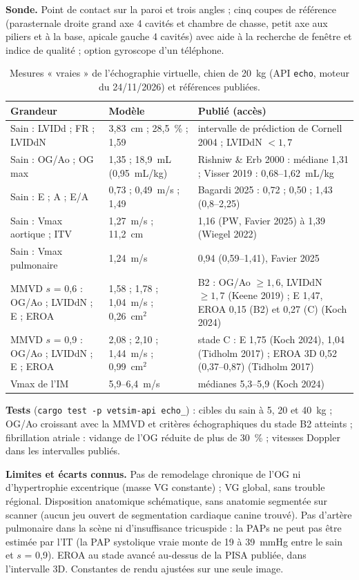 \documentclass[10pt,a4paper]{article}
\newcommand{\cmd}[1]{\texttt{#1}}
\newcommand{\limite}[1]{\par\textbf{Limites et écarts connus.} #1}
\begin{document}
\textbf{Sonde.} Point de contact sur la paroi et trois angles ; cinq coupes de référence (parasternale droite grand axe 4 cavités et chambre de chasse, petit axe aux piliers et à la base, apicale gauche 4 cavités) avec aide à la recherche de fenêtre et indice de qualité ; option gyroscope d'un téléphone.

\begin{table}[h]\centering\small
\caption{Mesures « vraies » de l'échographie virtuelle, chien de 20~kg (API \cmd{echo}, moteur du 24/11/2026) et références publiées.}\label{tab:echo}
\begin{tabular}{@{}p{4.1cm}p{4.6cm}p{6.6cm}@{}}
\toprule
Grandeur & Modèle & Publié (accès)\\
\midrule
Sain : LVIDd ; FR ; LVIDdN & 3,83~cm ; 28,5~\% ; 1,59 & intervalle de prédiction de Cornell 2004 ; LVIDdN $< 1{,}7$\\
Sain : OG/Ao ; OG max & 1,35 ; 18,9~mL (0,95~mL/kg) & Rishniw \& Erb 2000 : médiane 1,31 ; Visser 2019 : 0,68--1,62~mL/kg\\
Sain : E ; A ; E/A & 0,73 ; 0,49~m/s ; 1,49 & Bagardi 2025 : 0,72 ; 0,50 ; 1,43 (0,8--2,25)\\
Sain : Vmax aortique ; ITV & 1,27~m/s ; 11,2~cm & 1,16 (PW, Favier 2025) à 1,39 (Wiegel 2022)\\
Sain : Vmax pulmonaire & 1,24~m/s & 0,94 (0,59--1,41), Favier 2025\\
MMVD $s$ = 0,6 : OG/Ao ; LVIDdN ; E ; EROA & 1,58 ; 1,78 ; 1,04~m/s ; 0,26~cm$^2$ & B2 : OG/Ao $\ge 1{,}6$, LVIDdN $\ge 1{,}7$ (Keene 2019) ; E 1,47, EROA 0,15 (B2) et 0,27 (C) (Koch 2024)\\
MMVD $s$ = 0,9 : OG/Ao ; LVIDdN ; E ; EROA & 2,08 ; 2,10 ; 1,44~m/s ; 0,99~cm$^2$ & stade C : E 1,75 (Koch 2024), 1,04 (Tidholm 2017) ; EROA 3D 0,52 (0,37--0,87) (Tidholm 2017)\\
Vmax de l'IM & 5,9--6,4~m/s & médianes 5,3--5,9 (Koch 2024)\\
\bottomrule
\end{tabular}
\end{table}

\textbf{Tests} (\cmd{cargo test -p vetsim-api echo\_}) : cibles du sain à 5, 20 et 40~kg ; OG/Ao croissant avec la MMVD et critères échographiques du stade B2 atteints ; fibrillation atriale : vidange de l'OG réduite de plus de 30~\% ; vitesses Doppler dans les intervalles publiés.

\limite{Pas de remodelage chronique de l'OG ni d'hypertrophie excentrique (masse VG constante) ; VG global, sans trouble régional. Disposition anatomique schématique, sans anatomie segmentée sur scanner (aucun jeu ouvert de segmentation cardiaque canine trouvé). Pas d'artère pulmonaire dans la scène ni d'insuffisance tricuspide : la PAPs ne peut pas être estimée par l'IT (la PAP systolique vraie monte de 19 à 39~mmHg entre le sain et $s$ = 0,9). EROA au stade avancé au-dessus de la PISA publiée, dans l'intervalle 3D. Constantes de rendu ajustées sur une seule image.}
\end{document}

